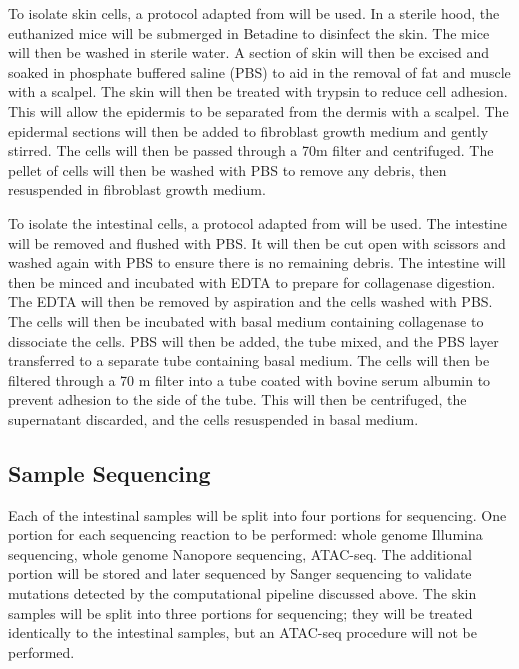 To isolate skin cells, a protocol adapted from \cite{jensen_isolation_2013} will be used.
In a sterile hood, the euthanized mice will be submerged in Betadine to disinfect the skin. The mice will then be washed in sterile water. A section of skin will then be excised and soaked in phosphate buffered saline (PBS) to aid in the removal of fat and muscle with a scalpel. The skin will then be treated with trypsin to reduce cell adhesion. This will allow the epidermis to be separated from the dermis with a scalpel. The epidermal sections will then be 
added to fibroblast growth medium and gently stirred. The cells will then be passed through a 70\mu m filter and centrifuged. The pellet of cells will then be washed with PBS to remove any debris, then resuspended in fibroblast growth medium.

To isolate the intestinal cells, a protocol adapted from \cite{orourke_isolation_2016} will be used.
The intestine will be removed and flushed with PBS. It will then be cut open with scissors and washed again with PBS to ensure there is no remaining debris. The intestine will then be minced and incubated with EDTA to prepare for collagenase digestion. The EDTA will then be removed by aspiration and the cells washed with PBS. The cells will then be incubated with basal medium containing collagenase to dissociate the cells. PBS will then be added, the tube mixed, and the PBS layer transferred to a separate tube containing basal medium. The cells will then be filtered through a 70 \mu m filter into a tube coated with bovine serum albumin to prevent adhesion to the side of the tube. This will then be centrifuged, the supernatant discarded, and the cells resuspended in basal medium.

\subsection{Sample Sequencing}

Each of the intestinal samples will be split into four portions for sequencing. One portion for each sequencing reaction to be performed: whole genome Illumina sequencing, whole genome Nanopore sequencing, ATAC-seq. The additional portion will be stored and later sequenced by Sanger sequencing to validate mutations detected by the computational pipeline discussed above. The skin samples will be split into three portions for sequencing; they will be treated identically to the intestinal samples, but an ATAC-seq procedure will not be performed.

